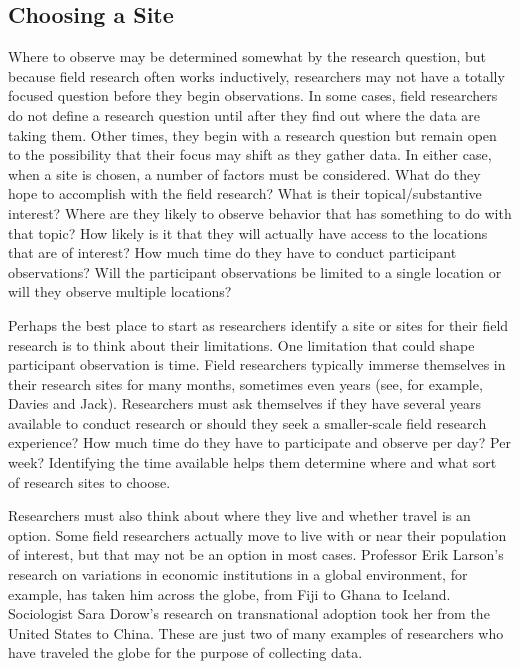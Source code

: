 \subsection{Choosing a Site}

Where to observe may be determined somewhat by the research question, but because field research often works inductively, researchers may not have a totally focused question before they begin observations. In some cases, field researchers do not define a research question until after they find out where the data are taking them. Other times, they begin with a research question but remain open to the possibility that their focus may shift as they gather data. In either case, when a site is chosen, a number of factors must be considered. What do they hope to accomplish with the field research? What is their topical/substantive interest? Where are they likely to observe behavior that has something to do with that topic? How likely is it that they will actually have access to the locations that are of interest? How much time do they have to conduct participant observations? Will the participant observations be limited to a single location or will they observe multiple locations?

Perhaps the best place to start as researchers identify a site or sites for their field research is to think about their limitations. One limitation that could shape participant observation is time. Field researchers typically immerse themselves in their research sites for many months, sometimes even years (see, for example, Davies\cite{davies2010corporate} and Jack\cite{jack2010entrepreneurial}). Researchers must ask themselves if they have several years available to conduct research or should they seek a smaller-scale field research experience? How much time do they have to participate and observe per day? Per week? Identifying the time available helps them determine where and what sort of research sites to choose.

Researchers must also think about where they live and whether travel is an option. Some field researchers actually move to live with or near their population of interest, but that may not be an option in most cases. Professor Erik Larson’s research on variations in economic institutions in a global environment, for example, has taken him across the globe, from Fiji to Ghana to Iceland\cite{larson2010time}. Sociologist Sara Dorow's research on transnational adoption took her from the United States to China\cite{dorow2006racialized}. These are just two of many examples of researchers who have traveled the globe for the purpose of collecting data. 

